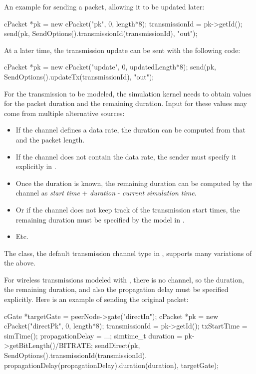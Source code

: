 An example for sending a packet, allowing it to be updated later:

\begin{cpp}
cPacket *pk = new cPacket("pk", 0, length*8);
transmissionId = pk->getId();
send(pk, SendOptions().transmissionId(transmissionId), "out");
\end{cpp}

At a later time, the transmission update can be sent with the following code:

\begin{cpp}
cPacket *pk = new cPacket("update", 0, updatedLength*8);
send(pk, SendOptions().updateTx(transmissionId), "out");
\end{cpp}

For the transmission to be modeled, the simulation kernel needs to obtain
values for the packet duration and the remaining duration. Input for these values
may come from multiple alternative sources:

\begin{itemize}
  \item If the channel defines a data rate, the duration can be
    computed from that and the packet length.
  \item If the channel does not contain the data rate, the sender must specify
    it explicitly in .
  \item Once the duration is known, the remaining duration can be computed by
    the channel as \textit{start time} + \textit{duration} - \textit{current simulation time}.
  \item Or if the channel does not keep track of the transmission start times,
    the remaining duration must be specified by the model in .
  \item Etc.
\end{itemize}

The  class, the default transmission channel type in {\omnetpp},
supports many variations of the above.

For wireless transmissions modeled with , there is no channel,
so the duration, the remaining duration, and also the propagation delay must be
specified explicitly. Here is an example of sending the original packet:

\begin{cpp}
cGate *targetGate = peerNode->gate("directIn");
cPacket *pk = new cPacket("directPk", 0, length*8);
transmissionId = pk->getId();
txStartTime = simTime();
propagationDelay = ...;
simtime_t duration = pk->getBitLength()/BITRATE;
sendDirect(pk,
    SendOptions().transmissionId(transmissionId).
                  propagationDelay(propagationDelay).duration(duration),
    targetGate);
\end{cpp}

